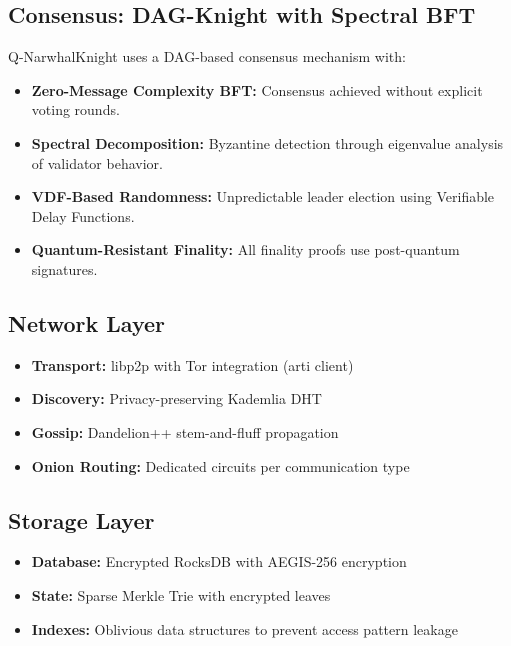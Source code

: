 \documentclass[12pt,a4paper]{article}
\begin{document}
\subsection{Consensus: DAG-Knight with Spectral BFT}

Q-NarwhalKnight uses a DAG-based consensus mechanism with:

\begin{itemize}
    \item \textbf{Zero-Message Complexity BFT:} Consensus achieved without explicit voting rounds.
    \item \textbf{Spectral Decomposition:} Byzantine detection through eigenvalue analysis of validator behavior.
    \item \textbf{VDF-Based Randomness:} Unpredictable leader election using Verifiable Delay Functions.
    \item \textbf{Quantum-Resistant Finality:} All finality proofs use post-quantum signatures.
\end{itemize}

\subsection{Network Layer}

\begin{itemize}
    \item \textbf{Transport:} libp2p with Tor integration (arti client)
    \item \textbf{Discovery:} Privacy-preserving Kademlia DHT
    \item \textbf{Gossip:} Dandelion++ stem-and-fluff propagation
    \item \textbf{Onion Routing:} Dedicated circuits per communication type
\end{itemize}

\subsection{Storage Layer}

\begin{itemize}
    \item \textbf{Database:} Encrypted RocksDB with AEGIS-256 encryption
    \item \textbf{State:} Sparse Merkle Trie with encrypted leaves
    \item \textbf{Indexes:} Oblivious data structures to prevent access pattern leakage
\end{itemize}
\end{document}
